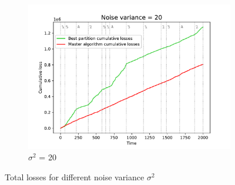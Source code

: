 \documentclass[12pt, twoside]{article}
\begin{document}
\begin{figure}[htb]
\begin{subfigure}{0.33\textwidth}
  \includegraphics[width=\linewidth]{noise_20}
  \caption{$\sigma^2$ = 20}
  \label{fig:6}
\end{subfigure}
\caption{Total losses for different noise variance $\sigma^2$}
\label{fig:images}
\end{figure}
\end{document}
